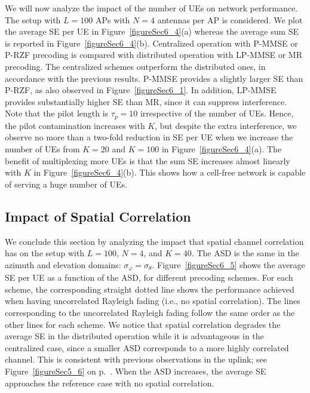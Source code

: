 We will now analyze the impact of the number of UEs on network performance. The setup with $L=100$ APs with $N=4$ antennas per AP is considered.
We plot the average SE per UE in Figure~\ref{figureSec6_4}(a) whereas the average sum SE is reported in Figure~\ref{figureSec6_4}(b). Centralized operation with P-MMSE or P-RZF precoding is compared with distributed operation with LP-MMSE or MR precoding. 
The centralized schemes outperform the distributed ones, in accordance with the previous results. P-MMSE provides a slightly larger SE than P-RZF, as also observed in Figure~\ref{figureSec6_1}. In addition, LP-MMSE provides substantially higher SE than MR, since it can suppress interference. Note that the pilot length is $\tau_p=10$ irrespective of the number of UEs. Hence, the pilot contamination increases with $K$, but despite the extra interference, we observe no more than a two-fold reduction in SE per UE when we increase the number of UEs from $K=20$ and $K=100$ in Figure~\ref{figureSec6_4}(a). 
The benefit of multiplexing more UEs is that the sum SE increases almost linearly with $K$ in Figure~\ref{figureSec6_4}(b). This shows how a cell-free network is capable of serving a huge number of UEs. 




\subsection{Impact of Spatial Correlation}

We conclude this section by analyzing the impact that spatial channel correlation has on the setup with $L=100$, $N=4$, and $K=40$. The ASD is the same in the azimuth and elevation domains: $\sigma_{\varphi}=\sigma_{\theta}$.
Figure~\ref{figureSec6_5} shows the average SE per UE as a function of the ASD, for different precoding schemes.
For each scheme, the corresponding straight dotted line shows the performance achieved when having uncorrelated Rayleigh fading (i.e., no spatial correlation). The lines corresponding to the uncorrelated Rayleigh fading follow the same order as the other lines for each scheme. We notice that spatial correlation degrades the average SE in the distributed operation while it is advantageous in the centralized case, since a smaller ASD corresponds to a more highly correlated channel. This is consistent with previous observations in the uplink; see Figure~\ref{figureSec5_6} on p.~\pageref{figureSec5_6}.
When the ASD increases, the average SE approaches the reference case with no spatial correlation.



